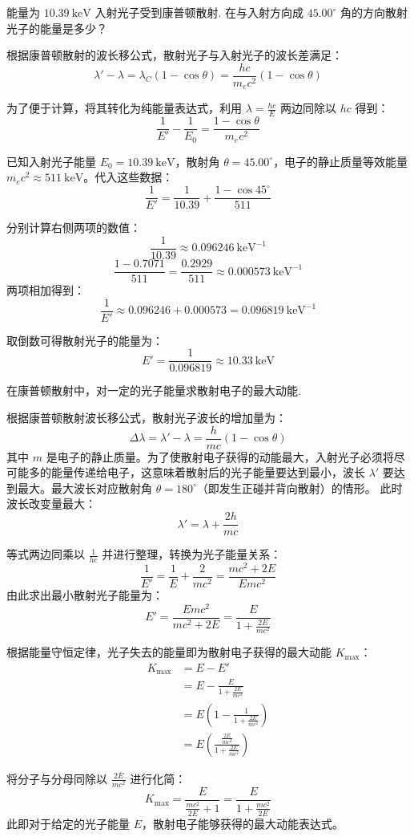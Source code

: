 \begin{exercise}\label{ex:22.8}
能量为 $10.39 \ \mathrm{keV}$ 入射光子受到康普顿散射. 在与入射方向成 $45.00^\circ$ 角的方向散射光子的能量是多少？
\end{exercise}
\begin{solution}
根据康普顿散射的波长移公式，散射光子与入射光子的波长差满足：
$$ \lambda' - \lambda = \lambda_C (1 - \cos\theta) = \frac{hc}{m_e c^2} (1 - \cos\theta) $$

为了便于计算，将其转化为纯能量表达式，利用 $\lambda = \frac{hc}{E}$ 两边同除以 $hc$ 得到：
$$ \frac{1}{E'} - \frac{1}{E_0} = \frac{1 - \cos\theta}{m_e c^2} $$

已知入射光子能量 $E_0 = 10.39 \ \mathrm{keV}$，散射角 $\theta = 45.00^\circ$，电子的静止质量等效能量 $m_e c^2 \approx 511 \ \mathrm{keV}$。代入这些数据：
$$ \frac{1}{E'} = \frac{1}{10.39} + \frac{1 - \cos 45^\circ}{511} $$

分别计算右侧两项的数值：
$$ \frac{1}{10.39} \approx 0.096246 \ \mathrm{keV^{-1}} $$
$$ \frac{1 - 0.7071}{511} = \frac{0.2929}{511} \approx 0.000573 \ \mathrm{keV^{-1}} $$
两项相加得到：
$$ \frac{1}{E'} \approx 0.096246 + 0.000573 = 0.096819 \ \mathrm{keV^{-1}} $$

取倒数可得散射光子的能量为：
$$ E' = \frac{1}{0.096819} \approx 10.33 \ \mathrm{keV} $$
\end{solution}

\begin{exercise}\label{ex:22.9}
在康普顿散射中，对一定的光子能量求散射电子的最大动能.
\end{exercise}
\begin{solution}
根据康普顿散射波长移公式，散射光子波长的增加量为：
$$ \Delta \lambda = \lambda' - \lambda = \frac{h}{mc} (1 - \cos\theta) $$
其中 $m$ 是电子的静止质量。为了使散射电子获得的动能最大，入射光子必须将尽可能多的能量传递给电子，这意味着散射后的光子能量要达到最小，波长 $\lambda'$ 要达到最大。最大波长对应散射角 $\theta = 180^\circ$（即发生正碰并背向散射）的情形。
此时波长改变量最大：
$$ \lambda' = \lambda + \frac{2h}{mc} $$

等式两边同乘以 $\frac{1}{hc}$ 并进行整理，转换为光子能量关系：
$$ \frac{1}{E'} = \frac{1}{E} + \frac{2}{mc^2} = \frac{mc^2 + 2E}{E mc^2} $$
由此求出最小散射光子能量为：
$$ E' = \frac{E mc^2}{mc^2 + 2E} = \frac{E}{1 + \frac{2E}{mc^2}} $$

根据能量守恒定律，光子失去的能量即为散射电子获得的最大动能 $K_{\max}$：
\begin{align*}
    K_{\max} &= E - E' \\
             &= E - \frac{E}{1 + \frac{2E}{mc^2}} \\
             &= E \left( 1 - \frac{1}{1 + \frac{2E}{mc^2}} \right) \\
             &= E \left( \frac{\frac{2E}{mc^2}}{1 + \frac{2E}{mc^2}} \right)
\end{align*}

将分子与分母同除以 $\frac{2E}{mc^2}$ 进行化简：
$$ K_{\max} = \frac{E}{\frac{mc^2}{2E} + 1} = \frac{E}{1 + \frac{mc^2}{2E}} $$
此即对于给定的光子能量 $E$，散射电子能够获得的最大动能表达式。
\end{solution}

